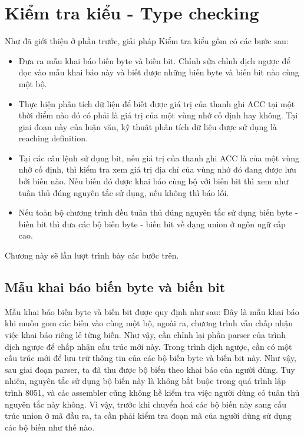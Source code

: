 \section{Kiểm tra kiểu - Type checking}

Như đã giới thiệu ở phần trước, giải pháp Kiểm tra kiểu gồm có các bước sau:
\begin{itemize}
\item Đưa ra mẫu khai báo biến byte và biến bit. Chỉnh sửa chỉnh dịch ngược để đọc vào mẫu khai báo này và biết được những biến byte và biến bit nào cùng một bộ.
\item Thực hiện phân tích dữ liệu để biết được giá trị của thanh ghi ACC tại một thời điểm nào đó có phải là giá trị của một vùng nhớ cố định hay không. Tại giai đoạn này của luận văn, kỹ thuật phân tích dữ liệu được sử dụng là reaching definition.
\item Tại các câu lệnh sử dụng bit, nếu giá trị của thanh ghi ACC là của một vùng nhớ cố định, thì kiểm tra xem giá trị địa chỉ của vùng nhớ đó đang được lưu bởi biến nào. Nếu biến đó được khai báo cùng bộ với biến bit thì xem như tuân thủ đúng nguyên tắc sử dụng, nếu không thì báo lỗi.
\item Nếu toàn bộ chương trình đều tuân thủ đúng nguyên tắc sử dụng biến byte - biến bit thì đưa các bộ biến byte - biến bit về dạng union ở ngôn ngữ cấp cao.
\end{itemize}
Chương này sẽ lần lượt trình bày các bước trên.

\subsection{Mẫu khai báo biến byte và biến bit}
Mẫu khai báo biến byte và biến bit được quy định như sau:
Đây là mẫu khai báo khi muốn gom các biến vào cùng một bộ, ngoài ra, chương trình vẫn chấp nhận việc khai báo riêng lẻ từng biến. Như vậy, cần chỉnh lại phần parser của trình dịch ngược để chấp nhận cấu trúc mới này.
Trong trình dịch ngược, cần có một cấu trúc mới để lưu trữ thông tin của các bộ biến byte và biến bit này.
Như vậy, sau giai đoạn parser, ta đã thu được bộ biến theo khai báo của người dùng. Tuy nhiên, nguyên tắc sử dụng bộ biến này là không bắt buộc trong quá trình lập trình 8051, và các assembler cũng không hề kiểm tra việc người dùng có tuân thủ nguyên tắc này không. Vì vậy, trước khi chuyển hoá các bộ biến này sang cấu trúc union ở mã đầu ra, ta cần phải kiểm tra đoạn mã của người dùng sử dụng các bộ biến như thế nào.

